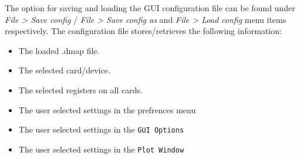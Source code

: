 The option for saving and loading the GUI configuration file can be found under
\textit{File > Save config} / \textit{File > Save config as} and \textit{File >
Load config }menu items respectively. The configuration file stores/retrieves
the following information:

\begin{itemize} 
	\item The loaded .dmap file.  \item The selected card/device.
    \item The selected registers on all cards.  \item The user selected
    settings in the prefrences menu \item The user selected settings in the
    \texttt{GUI Options} \item The user selected settings in the
    \texttt{Plot Window} 
\end{itemize}



%
%


%
%
%
%
%




